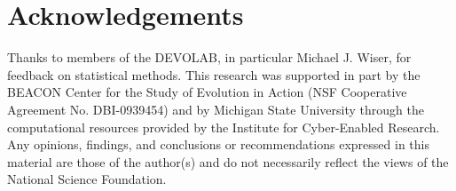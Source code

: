 \section{Acknowledgements}

Thanks to members of the DEVOLAB, in particular Michael J. Wiser, for feedback on statistical methods.  This research was supported in part by the BEACON Center for the Study of Evolution in Action (NSF Cooperative Agreement No. DBI-0939454) and by Michigan State University through the computational resources provided by the Institute for Cyber-Enabled Research. Any opinions, findings, and conclusions or recommendations expressed in this material are those of the author(s) and do not necessarily reflect the views of the National Science Foundation.
